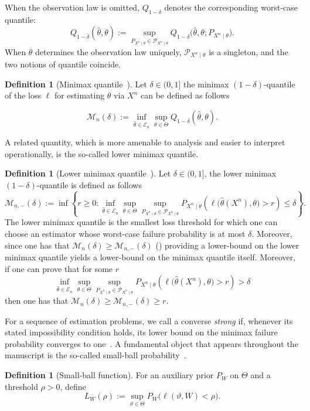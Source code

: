 \documentclass[11pt]{article}
\theoremstyle{definition}
\newtheorem{definition}[theorem]{Definition}
\theoremstyle{remark}
\newcommand{\1}{\boldsymbol{1}}
\begin{document}
When the observation law is omitted, \(Q_{1-\delta}\) denotes the corresponding worst-case quantile:
\[
Q_{1-\delta}(\widehat\theta,\theta)
:=
\sup_{P_{X^n\mid\theta}\in\mathscr P_{X^n\mid\theta}}
Q_{1-\delta}
\bigl(\widehat\theta,\theta;P_{X^n\mid\theta}\bigr).
\]
When \(\theta\) determines the observation law uniquely, \(\mathscr P_{X^n\mid\theta}\) is a singleton, and the two notions of quantile coincide.
\begin{definition}[Minimax quantile~\cite{MaVerchandSamworth2024}]
\label{def:minimax-quantile}
Let \(\delta \in (0,1]\) the minimax \((1-\delta)\)-quantile of the loss $\ell$ for estimating \(\theta\) via \(X^n\) can be defined as follows


\[
\mathcal M_n(\delta)
:=
\inf_{\widehat\theta\in\mathcal E_n}
\sup_{\theta\in\Theta}
Q_{1-\delta}(\widehat\theta,\theta).
\]
\end{definition}
A related quantity, which is more amenable to analysis and easier to interpret operationally, is the so-called lower minimax quantile.
\begin{definition}[Lower minimax quantile~\cite{MaVerchandSamworth2024}]
\label{def:lower-minimax-quantile}
Let \(\delta \in (0,1]\), the lower minimax \((1-\delta)\)-quantile is defined as follows
\[
\mathcal M_{n,-}(\delta) := \inf\left\{ r\geq 0 : 
\inf_{\widehat\theta\in\mathcal E_n}
\sup_{\theta\in\Theta}\sup_{P_{X^n\mid\theta}\in\mathscr P_{X^n\mid\theta}}P_{X^n\mid\theta}
\left(
\ell\bigl(\widehat\theta(X^n),\theta\bigr)> r
\right)
\le \delta
\right\}.
\]
The lower minimax quantile is the smallest loss threshold for which one can choose an estimator whose worst-case failure probability is at most \(\delta\).
Moreover, since one has that $\mathcal M_n(\delta) \geq \mathcal M_{n,-}(\delta)$ (\cite[Theorem 4]{MaVerchandSamworth2024}) providing a lower-bound on the lower minimax quantile yields a lower-bound on the minimax quantile itself. Moreover, if one can prove that for some $r$
\[
\inf_{\widehat\theta\in\mathcal E_n}
\sup_{\theta\in\Theta}\sup_{P_{X^n\mid\theta}\in\mathscr P_{X^n\mid\theta}}P_{X^n\mid\theta}
\left(
\ell\bigl(\widehat\theta(X^n),\theta\bigr)> r
\right)
> \delta
\]
then one has that $\mathcal M_n(\delta)\geq \mathcal M_{n,-}(\delta) \geq r$.
\end{definition}
For a sequence of estimation problems, we call a converse \emph{strong}
if, whenever its stated impossibility condition holds, its lower bound on
the minimax failure probability converges to one~\cite{VenkataramananJohnson2018}.  %
A fundamental object that appears throughout the manuscript is the so-called small-ball probability~\cite{XuRaginsky2017,ChenGuntuboyinaZhang2016,EspositoVandenbroucqueGastpar2024}.
\begin{definition}[Small-ball function]
For an auxiliary prior $P_W$ on $\Theta$ and a threshold $\rho>0$, define
\begin{equation}
L_W(\rho)
:=
\sup_{\vartheta\in\Theta}
P_W\bigl(\ell(\vartheta,W)<\rho\bigr).
\label{eq:smallBallFunction}
\end{equation}
\end{definition}
\end{document}
